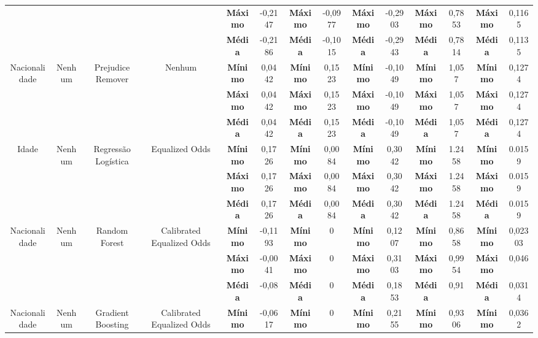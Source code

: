 \documentclass[portugues]{ic-tese}
\begin{document}
\begin{table}[H]
\begin{center}
{\begin{tabular}{c|c|c|c|c|c|c|c|c|c|c|c|c|c}
             & & & & \textbf{Máximo} & -0,2147 & \textbf{Máximo} & -0,0977 & \textbf{Máximo} & -0,2903 & \textbf{Máximo} & 0,7853 & \textbf{Máximo} & 0,1165 \\
             & & & & \textbf{Média} & -0,2186 & \textbf{Média} & -0,1015 & \textbf{Média} & -0,2943 & \textbf{Média} & 0,7814 & \textbf{Média} & 0,1135 \\
            \hline
            \multirow{3}{*}{Nacionalidade} & \multirow{3}{*}{Nenhum} & \multirow{3}{*}{Prejudice Remover} & \multirow{3}{*}{Nenhum} & \textbf{Mínimo} & 0,0442 & \textbf{Mínimo} & 0,1523 & \textbf{Mínimo} & -0,1049 & \textbf{Mínimo} &  1,057 & \textbf{Mínimo} & 0,1274 \\
             & & & & \textbf{Máximo} & 0,0442 & \textbf{Máximo} & 0,1523 & \textbf{Máximo} & -0,1049 & \textbf{Máximo} & 1,057 & \textbf{Máximo} & 0,1274 \\
             & & & & \textbf{Média} & 0,0442 & \textbf{Média} & 0,1523 & \textbf{Média} & -0,1049 & \textbf{Média} & 1,057 & \textbf{Média} & 0,1274 \\
            \hline
            \multirow{3}{*}{Idade} & \multirow{3}{*}{Nenhum} & \multirow{3}{*}{Regressão Logística} & \multirow{3}{*}{Equalized Odds} & \textbf{Mínimo} & 0,1726 & \textbf{Mínimo} & 0,0084 & \textbf{Mínimo} & 0,3042 & \textbf{Mínimo} & 1.2458 & \textbf{Mínimo} & 0.0159 \\
             & & & & \textbf{Máximo} & 0,1726 & \textbf{Máximo} & 0,0084 & \textbf{Máximo} & 0,3042 & \textbf{Máximo} & 1.2458 & \textbf{Máximo} & 0.0159 \\
             & & & & \textbf{Média} & 0,1726 & \textbf{Média} & 0,0084 & \textbf{Média} & 0,3042 & \textbf{Média} & 1.2458 & \textbf{Média} & 0.0159 \\
            \hline
            \multirow{3}{*}{Nacionalidade} & \multirow{3}{*}{Nenhum} & \multirow{3}{*}{Random Forest} & \multirow{3}{*}{Calibrated Equalized Odds} & \textbf{Mínimo} & -0,1193 & \textbf{Mínimo} & 0 & \textbf{Mínimo} & 0,1207 & \textbf{Mínimo} & 0,8658 & \textbf{Mínimo} & 0,02303 \\
             & & & & \textbf{Máximo} & -0,0041 & \textbf{Máximo} & 0 & \textbf{Máximo} & 0,3103 & \textbf{Máximo} & 0,9954 & \textbf{Máximo} & 0,046 \\
             & & & & \textbf{Média} & -0,08 & \textbf{Média} & 0 & \textbf{Média} & 0,1853 & \textbf{Média} & 0,91 & \textbf{Média} & 0,0314 \\
            \hline
            \multirow{3}{*}{Nacionalidade} & \multirow{3}{*}{Nenhum} & \multirow{3}{*}{Gradient Boosting} & \multirow{3}{*}{Calibrated Equalized Odds} & \textbf{Mínimo} & -0,0617 & \textbf{Mínimo} & 0 & \textbf{Mínimo} & 0,2155 & \textbf{Mínimo} & 0,9306 & \textbf{Mínimo} & 0,0362 \\

\end{tabular}}
\end{center}
\end{table}
\end{document}
